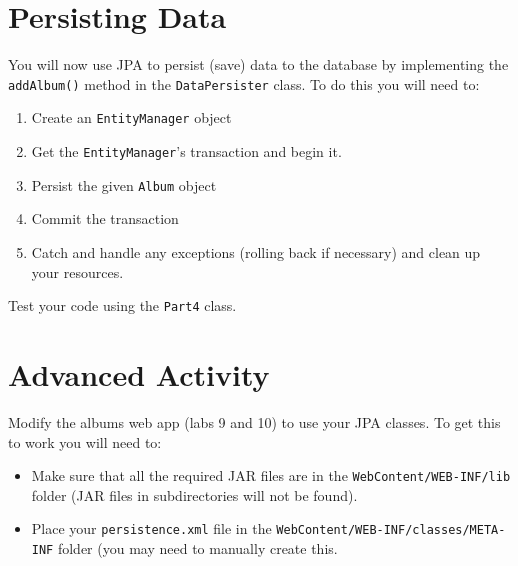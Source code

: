 \documentclass[12pt]{scrartcl}
\begin{document}
\section*{Persisting Data}

You will now use JPA to persist (save) data to the database by implementing the 
\texttt{addAlbum()} method in the \texttt{DataPersister} class.
To do this you will need to:
  
\begin{enumerate}
  \item Create an \texttt{EntityManager} object
  \item Get the \texttt{EntityManager}'s transaction and begin it.
  \item Persist the given \texttt{Album} object
  \item Commit the transaction
  \item Catch and handle any exceptions (rolling back if necessary) and
  	clean up your resources.
\end{enumerate}

Test your code using the \texttt{Part4} class.

\section*{Advanced Activity}

Modify the albums web app (labs 9 and 10) to use your JPA classes.  To get this
to work you will need to:
\begin{itemize}
  \item Make sure that all the required JAR files are in the \texttt{WebContent/WEB-INF/lib} folder (JAR files in subdirectories will not be found).
  \item Place your \texttt{persistence.xml} file in the 
  \texttt{WebContent/WEB-INF/classes/META-INF} folder (you may need to
  manually create this.
\end{itemize}
\end{document}
